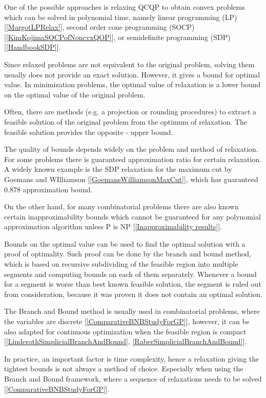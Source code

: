 \documentclass[12pt]{book}
\theoremstyle{definition}
\begin{document}
One of the possible approaches is relaxing QCQP to obtain convex problems which can be solved in polynomial time, namely linear programming (LP) [\ref{MargotLPRelax}], second order cone programming  (SOCP) [\ref{KimKojimaSOCPofNoncvxQOP}], or semidefinite programming (SDP) [\ref{HandbookSDP}].


Since relaxed problems are not equivalent to the original problem, solving them usually does not provide an exact solution. However, it gives a bound for optimal value. In minimization problems, the optimal value of relaxation is a lower bound on the optimal value of the original problem. 

Often, there are methods (e.g. a projection or rounding procedures) to extract a feasible solution of the original problem from the optimum of relaxation. The feasible solution provides the opposite - upper bound.


The quality of bounds depends widely on the problem and method of relaxation. For some problems there is guaranteed approximation ratio for certain relaxation. A widely known example is the SDP relaxation for the maximum cut by Goemans and WIlliamson [\ref{GoemansWilliamsonMaxCut}], which has guaranteed 0.878 approximation bound.

On the other hand, for many combinatorial problems there are also known certain inapproximability bounds which cannot be guaranteed for any polynomial approximation algorithm unless P is NP [\ref{Inapproximability results}]. 


Bounds on the optimal value can be used to find the optimal solution with a proof of optimality. Such proof can be done by the branch and bound method, which is based on recursive subdividing of the feasible region into multiple segments and computing bounds on each of them separately. Whenever a bound for a segment is worse than best known feasible solution, the segment is ruled out from consideration, because it was proven it does not contain an optimal solution. 

The Branch and Bound method is usually used in combinatorial problems, where the variables are discrete [\ref{ComparativeBNBStudyForGP}], however, it can be also adapted for continuous optimization when the feasible region is compact [\ref{LinderothSimplicialBranchAndBound}, \ref{RaberSimplicialBranchAndBound}].

In practice, an important factor is time complexity, hence a relaxation giving the tightest bounds is not always a method of choice. Especially when using the Branch and Bound framework, where a sequence of relaxations needs to be solved [\ref{ComparativeBNBStudyForGP}].
\end{document}
